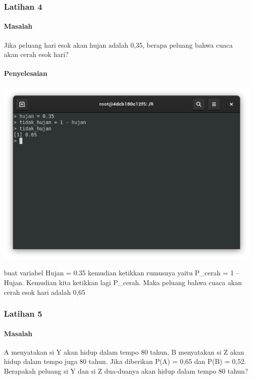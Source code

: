 \documentclass[a4paper,12pt]{article}
\begin{document}
\subsubsection{Latihan 4}
\paragraph{Masalah\\}
Jika peluang hari esok akan hujan adalah 0,35, berapa peluang bahwa cuaca akan cerah esok hari?
\paragraph{Penyelesaian\\}
\begin{center}
	\includegraphics[scale=.5]{lat4}
\end{center}
buat variabel Hujan = 0.35 kemudian ketikkan rumusnya yaitu P\_cerah = 1 – Hujan. Kemudian kita ketikkan lagi P\_cerah. Maka peluang bahwa cuaca akan cerah esok hari adalah 0,65

\subsubsection{Latihan 5}
\paragraph{Masalah\\}
A menyatakan si Y akan hidup dalam tempo 80 tahun, B menyatakan si Z akan hidup dalam tempo juga 80 tahun. Jika diberikan P(A) = 0,65 dan P(B) = 0,52. Berapakah peluang si Y dan si Z dua-duanya akan hidup dalam tempo 80 tahun?
\end{document}
